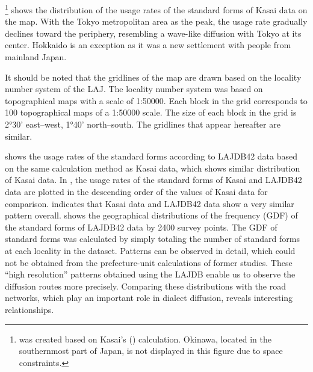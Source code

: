 \documentclass[output=paper]{LSP/langsci}
\begin{document}
\footnote{ was created based on Kasai’s (\citeyear{kasai_hyojun_1981}) calculation. Okinawa, located in the southernmost part of Japan, is not displayed in this figure due to space constraints.} shows the distribution of the usage rates of the standard forms of Kasai data on the map. With the Tokyo metropolitan area as the peak, the usage rate gradually declines toward the periphery, resembling a wave-like diffusion with Tokyo at its center. Hokkaido is an exception as it was a new settlement with people from mainland Japan.

It should be noted that the gridlines of the map are drawn based on the locality number system of the LAJ. The locality number system was based on topographical maps with a scale of 1:50000. Each block in the grid corresponds to 100 topographical maps of a 1:50000 scale. The size of each block in the grid is 2°30' east–west, 1°40' north–south. The gridlines that appear hereafter are similar. 

 shows the usage rates of the standard forms according to LAJDB42 data based on the same calculation method as Kasai data, which shows similar distribution of Kasai data. In , the usage rates of the standard forms of Kasai and LAJDB42 data are plotted in the descending order of the values of Kasai data for comparison.  indicates that Kasai data and LAJDB42 data show a very similar pattern overall.  shows the geographical distributions of the frequency (GDF) of the standard forms of LAJDB42 data by 2400 survey points. The GDF of standard forms was calculated by simply totaling the number of standard forms at each locality in the dataset. Patterns can be observed in detail, which could not be obtained from the prefecture-unit calculations of former studies. These “high resolution” patterns obtained using the LAJDB enable us to observe the diffusion routes more precisely. Comparing these distributions with the road networks, which play an important role in dialect diffusion, reveals interesting relationships. 
\end{document}
